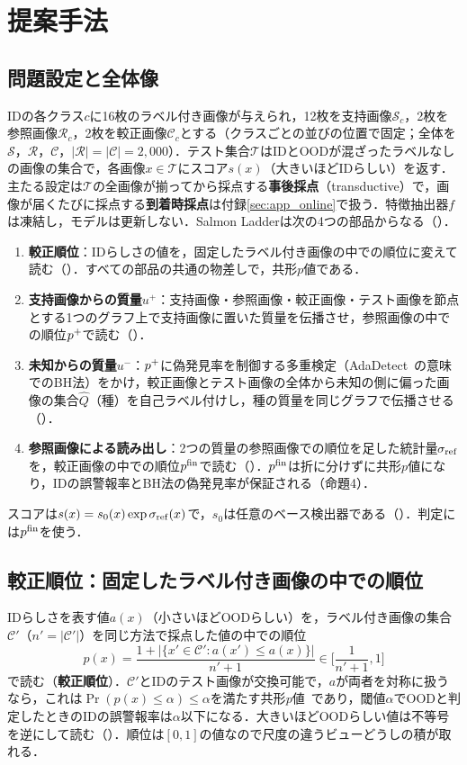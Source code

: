 \section{提案手法}
\label{sec:method}
\subsection{問題設定と全体像}
IDの各クラス$c$に16枚のラベル付き画像が与えられ，12枚を支持画像$\mathcal{S}_c$，2枚を参照画像$\mathcal{R}_c$，2枚を較正画像$\mathcal{C}_c$とする（クラスごとの並びの位置で固定；全体を$\mathcal{S}$，$\mathcal{R}$，$\mathcal{C}$，$|\mathcal{R}|=|\mathcal{C}|=2{,}000$）．テスト集合$\mathcal{T}$はIDとOODが混ざったラベルなしの画像の集合で，各画像$x\in\mathcal{T}$にスコア$s(x)$（大きいほどIDらしい）を返す．主たる設定は$\mathcal{T}$の全画像が揃ってから採点する\textbf{事後採点}（transductive）で，画像が届くたびに採点する\textbf{到着時採点}は付録\ref{sec:app_online}で扱う．特徴抽出器$f$は凍結し，モデルは更新しない．Salmon Ladderは次の4つの部品からなる（）．
\begin{enumerate}
\setlength{\itemsep}{0pt}
\item \textbf{較正順位}：IDらしさの値を，固定したラベル付き画像の中での順位に変えて読む（）．すべての部品の共通の物差しで，共形$p$値である．
\item \textbf{支持画像からの質量$u^{+}$}：支持画像・参照画像・較正画像・テスト画像を節点とする1つのグラフ上で支持画像に置いた質量を伝播させ，参照画像の中での順位$p^{+}$で読む（）．
\item \textbf{未知からの質量$u^{-}$}：$p^{+}$に偽発見率を制御する多重検定（AdaDetect~\cite{marandon2024adadetect}の意味でのBH法）をかけ，較正画像とテスト画像の全体から未知の側に偏った画像の集合$\hat{Q}$（種）を自己ラベル付けし，種の質量を同じグラフで伝播させる（）．
\item \textbf{参照画像による読み出し}：2つの質量の参照画像での順位を足した統計量$\sigma_{\mathrm{ref}}$を，較正画像の中での順位$p^{\mathrm{fin}}$で読む（）．$p^{\mathrm{fin}}$は折に分けずに共形$p$値になり，IDの誤警報率とBH法の偽発見率が保証される（命題4）．
\end{enumerate}
スコアは$s(x)=s_0(x)\exp\sigma_{\mathrm{ref}}(x)$で，$s_0$は任意のベース検出器である（）．判定には$p^{\mathrm{fin}}$を使う．

\subsection{較正順位：固定したラベル付き画像の中での順位}
\label{sec:rank}
IDらしさを表す値$a(x)$（小さいほどOODらしい）を，ラベル付き画像の集合$\mathcal{C}'$（$n'=|\mathcal{C}'|$）を同じ方法で採点した値の中での順位
\begin{equation}
p(x)=\frac{1+|\{x'\in\mathcal{C}':a(x')\le a(x)\}|}{n'+1}\in\Big[\frac{1}{n'+1},1\Big]
\label{eq:rank}
\end{equation}
で読む（\textbf{較正順位}）．$\mathcal{C}'$とIDのテスト画像が交換可能で，$a$が両者を対称に扱うなら，これは$\Pr(p(x)\le\alpha)\le\alpha$を満たす共形$p$値~\cite{bates2023conformal,marandon2024adadetect}であり，閾値$\alpha$でOODと判定したときのIDの誤警報率は$\alpha$以下になる．大きいほどOODらしい値は不等号を逆にして読む（）．順位は$[0,1]$の値なので尺度の違うビューどうしの積が取れる．

